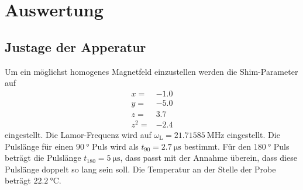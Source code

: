 \section{Auswertung}
\label{sec:Auswertung}

\subsection{Justage der Apperatur}
Um ein möglichst homogenes Magnetfeld einzustellen werden die Shim-Parameter auf 
\begin{align*}
  x =& \num{-1.0}\\
  y =& \num{-5.0}\\
  z =& \num{3.7}\\
  z^2 =& \num{-2.4}
\end{align*}
eingestellt.
Die Lamor-Frequenz wird auf $\omega_{\text{L}} = \SI{21.71585}{\mega\hertz}$ eingestellt.
Die Pulslänge für einen $\SI{90}{\degree}$ Puls wird als $t_{\text{90}}=\SI{2.7}{\micro\second}$ bestimmt.
Für den $\SI{180}{\degree}$ Puls beträgt die Pulslänge $t_{\text{180}}=\SI{5}{\micro\second}$, dass passt mit der 
Annahme überein, dass diese Pulslänge doppelt so lang sein soll. Die Temperatur an der Stelle der Probe beträgt $\SI{22.2}{\celsius}$.

